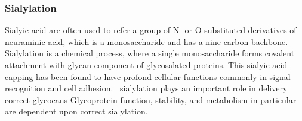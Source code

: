 \subsubsection {Sialylation}
Sialyic acid are often used to refer a group of N- or O-substituted derivatives of neuraminic acid, which is a monosaccharide and has a nine-carbon backbone.~\cite{Vocadlo_2009} Sialylation is a chemical process, where a single monosaccharide forms covalent attachment with glycan component of glycosalated proteins. This sialyic acid capping has been found to have profond cellular functions commonly in signal recognition and cell adhesion.~\cite{Bhide_2016} sialylation plays an important role in delivery correct glycocans Glycoprotein function, stability, and metabolism in particular are dependent upon correct sialylation.